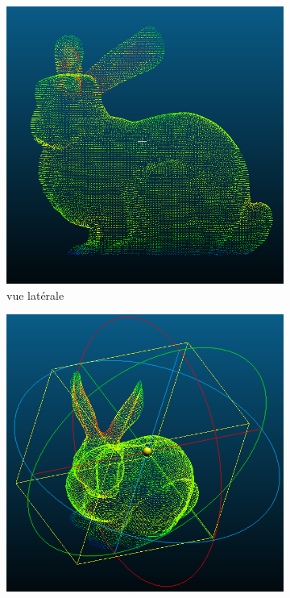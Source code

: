 \documentclass[../5RO17_TP4.tex]{subfiles}
\begin{document}
\begin{figure}[H]
    \centering
    \begin{subfigure}[b]{0.325\textwidth}
        \centering
        \includegraphics[width=\linewidth]{images/bunny_side.png}
        \caption{vue latérale}
        \label{}
    \end{subfigure}\hfill
    \begin{subfigure}[b]{0.325\textwidth}
        \centering
        \includegraphics[width=\linewidth]{images/bunny_axis.png}

\end{subfigure}
\end{figure}
\end{document}
